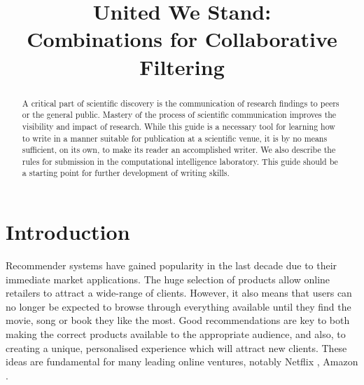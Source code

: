 \documentclass[10pt,conference,compsocconf]{IEEEtran}
\begin{document}
	\title{United We Stand:\\ Combinations for Collaborative Filtering}
	
	\author{
		\and
		\and
	}
	
	\maketitle
	
	\begin{abstract}
		A critical part of scientific discovery is the
		communication of research findings to peers or the general public.
		Mastery of the process of scientific communication improves the
		visibility and impact of research. While this guide is a necessary
		tool for learning how to write in a manner suitable for publication
		at a scientific venue, it is by no means sufficient, on its own, to
		make its reader an accomplished writer. We also describe the rules
		for submission in the computational intelligence laboratory.
		This guide should be a
		starting point for further development of writing skills.
	\end{abstract}
	
	\section{Introduction}
	
	Recommender systems have gained popularity in the last decade due to their immediate market applications. The huge selection of products allow online retailers to attract a wide-range of clients. However, it also means that users can no longer be expected to browse through everything available until they find the movie, song or book they like the most. Good recommendations are key to both making the correct products available to the appropriate audience, and also, to creating a unique, personalised experience which will attract new clients. These ideas are fundamental for many leading online ventures, notably Netflix \cite{amatriain2012netflix}, Amazon \cite{linden2003amazon}.
	
\end{document}
